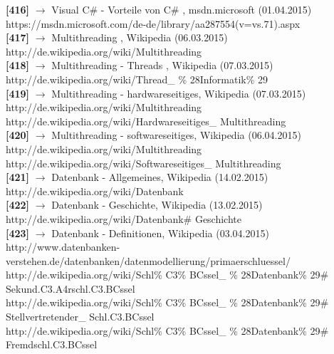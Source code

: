 \documentclass[12pt,a4paper]{report}
\begin{document}
\begin{onehalfspace}
\noindent
\textbf{[416]} $\rightarrow$ Visual C\# - Vorteile von C\# , msdn.microsoft (01.04.2015)\\
https://msdn.microsoft.com/de-de/library/aa287554(v=vs.71).aspx\\

\noindent
\textbf{[417]} $\rightarrow$ Multithreading , Wikipedia (06.03.2015)\\
http://de.wikipedia.org/wiki/Multithreading\\

\noindent
\textbf{[418]} $\rightarrow$ Multithreading - Threads , Wikipedia (07.03.2015)\\
http://de.wikipedia.org/wiki/Thread\_ \% 28Informatik\% 29\\

\noindent
\textbf{[419]} $\rightarrow$ Multithreading - hardwareseitiges, Wikipedia (07.03.2015)\\
http://de.wikipedia.org/wiki/Multithreading\\
http://de.wikipedia.org/wiki/Hardwareseitiges\_ Multithreading\\

\noindent
\textbf{[420]} $\rightarrow$ Multithreading - softwareseitiges, Wikipedia (06.04.2015)\\
http://de.wikipedia.org/wiki/Multithreading\\
http://de.wikipedia.org/wiki/Softwareseitiges\_ Multithreading\\

\noindent
\textbf{[421]} $\rightarrow$ Datenbank - Allgemeines, Wikipedia (14.02.2015)\\
http://de.wikipedia.org/wiki/Datenbank\\

\noindent
\textbf{[422]} $\rightarrow$ Datenbank - Geschichte, Wikipedia (13.02.2015)\\
http://de.wikipedia.org/wiki/Datenbank\# Geschichte\\

\noindent
\textbf{[423]} $\rightarrow$ Datenbank - Definitionen, Wikipedia (03.04.2015)\\
http://www.datenbanken-verstehen.de/datenbanken/datenmodellierung/primaerschluessel/\\
http://de.wikipedia.org/wiki/Schl\% C3\% BCssel\_ \% 28Datenbank\% 29\# \\ Sekund.C3.A4rschl.C3.BCssel\\
http://de.wikipedia.org/wiki/Schl\% C3\% BCssel\_ \% 28Datenbank\% 29\# Stellvertretender\_ Schl.C3.BCssel\\
http://de.wikipedia.org/wiki/Schl\% C3\% BCssel\_ \% 28Datenbank\% 29\# Fremdschl.C3.BCssel\\


\end{onehalfspace}
\end{document}
